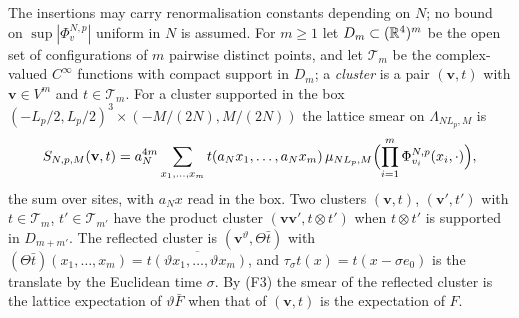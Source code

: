 The insertions may carry renormalisation constants depending on $N$; no
bound on $\sup|\Phi^{N,p}_v|$ uniform in $N$ is assumed. For $m\ge1$ let
$D_m\subset(\mathbb{R}^4)^m$ be the open set of configurations of $m$ pairwise
distinct points, and let $\mathcal T_m$ be the complex-valued
$C^\infty$ functions with compact support in $D_m$; a \emph{cluster} is a
pair $(\mathbf v,t)$ with $\mathbf v\in V^m$ and $t\in\mathcal T_m$. For a
cluster supported in the box $(-L_p/2,L_p/2)^3\times(-M/(2N),M/(2N))$ the
lattice smear on $\Lambda_{NL_p,M}$ is
\begin{equation}\label{eq:smear}
S_{N,p,M}(\mathbf v,t)=a_N^{4m}\sum_{x_1,\dots,x_m}t(a_Nx_1,\dots,a_Nx_m)\,
\mu_{NL_p,M}\Bigl(\prod_{i=1}^m\Phi^{N,p}_{v_i}(x_i,\cdot)\Bigr),
\end{equation}
the sum over sites, with $a_Nx$ read in the box. Two clusters
$(\mathbf v,t)$, $(\mathbf v',t')$ with $t\in\mathcal T_m$, $t'\in\mathcal
T_{m'}$ have the product cluster $(\mathbf v\mathbf v',t\otimes t')$ when
$t\otimes t'$ is supported in $D_{m+m'}$. The reflected cluster is
$(\mathbf v^\vartheta,\Theta\bar t)$ with $(\Theta\bar t)(x_1,\dots,x_m)=
\overline{t(\vartheta x_1,\dots,\vartheta x_m)}$, and $\tau_\sigma t(x)=
t(x-\sigma e_0)$ is the translate by the Euclidean time $\sigma$. By (F3)
the smear of the reflected cluster is the lattice expectation of
$\vartheta\bar F$ when that of $(\mathbf v,t)$ is the expectation of $F$.

